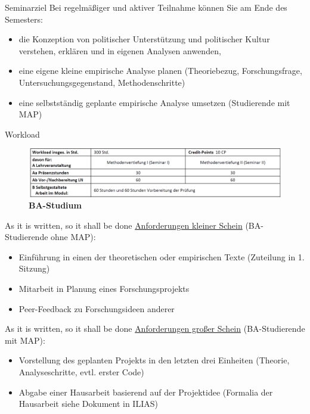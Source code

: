\documentclass[11pt]{beamer}
\begin{document}
\begin{frame}[t]{Seminarziel}
Bei regelmäßiger und aktiver Teilnahme können Sie am Ende des Semesters: \\
	
	\begin{itemize}
		\item die Konzeption von politischer Unterstützung und politischer Kultur verstehen, erklären und in eigenen Analysen anwenden,\pause
		\item eine eigene kleine empirische Analyse planen (Theoriebezug, Forschungsfrage, Untersuchungsgegenstand, Methodenschritte)\pause
		\item eine selbstständig geplante empirische Analyse umsetzen (Studierende mit MAP)\pause
	\end{itemize}

\end{frame}

\begin{frame}[t]{Workload}
	\begin{figure}[ht]
		\includegraphics[width=\textwidth]{pics/pre4.png}
		\caption{\textbf{BA-Studium}}
	\end{figure}
\end{frame}

\begin{frame}[t]{As it is written, so it shall be done}
\underline{Anforderungen kleiner Schein} (BA-Studierende ohne MAP):
	\begin{itemize}
		\item Einführung in einen der theoretischen oder empirischen Texte (Zuteilung in 1. Sitzung)
		\item Mitarbeit in Planung eines Forschungsprojekts
		\item Peer-Feedback zu Forschungsideen anderer 
	\end{itemize}
\end{frame}

\begin{frame}[t]{As it is written, so it shall be done}
\underline{Anforderungen großer Schein} (BA-Studierende mit MAP):
	\begin{itemize}
		\item Vorstellung des geplanten Projekts in den letzten drei Einheiten (Theorie, Analyseschritte, evtl. erster Code)
		\item Abgabe einer Hausarbeit basierend auf der Projektidee (Formalia der Hausarbeit siehe Dokument in ILIAS)
	\end{itemize}
\end{frame}
\end{document}
